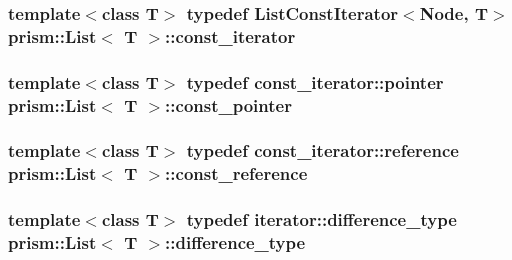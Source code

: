 \subsubsection[{\texorpdfstring{const\+\_\+iterator}{const_iterator}}]{\setlength{\rightskip}{0pt plus 5cm}template$<$class T$>$ typedef List\+Const\+Iterator$<$Node, T$>$ {\bf prism\+::\+List}$<$ T $>$\+::{\bf const\+\_\+iterator}}\hypertarget{classprism_1_1_list_a038bd36af263a85110467528db8305d5}{}\label{classprism_1_1_list_a038bd36af263a85110467528db8305d5}
\subsubsection[{\texorpdfstring{const\+\_\+pointer}{const_pointer}}]{\setlength{\rightskip}{0pt plus 5cm}template$<$class T$>$ typedef const\+\_\+iterator\+::pointer {\bf prism\+::\+List}$<$ T $>$\+::{\bf const\+\_\+pointer}}\hypertarget{classprism_1_1_list_ab7be76433c8a90f198e268a0918e8a6b}{}\label{classprism_1_1_list_ab7be76433c8a90f198e268a0918e8a6b}
\subsubsection[{\texorpdfstring{const\+\_\+reference}{const_reference}}]{\setlength{\rightskip}{0pt plus 5cm}template$<$class T$>$ typedef const\+\_\+iterator\+::reference {\bf prism\+::\+List}$<$ T $>$\+::{\bf const\+\_\+reference}}\hypertarget{classprism_1_1_list_a908620eac035bd6d020d69919aeffcbe}{}\label{classprism_1_1_list_a908620eac035bd6d020d69919aeffcbe}
\subsubsection[{\texorpdfstring{difference\+\_\+type}{difference_type}}]{\setlength{\rightskip}{0pt plus 5cm}template$<$class T$>$ typedef iterator\+::difference\+\_\+type {\bf prism\+::\+List}$<$ T $>$\+::{\bf difference\+\_\+type}}\hypertarget{classprism_1_1_list_a98f5a94db7ed98f032ee32ee34bbc8c8}{}\label{classprism_1_1_list_a98f5a94db7ed98f032ee32ee34bbc8c8}
